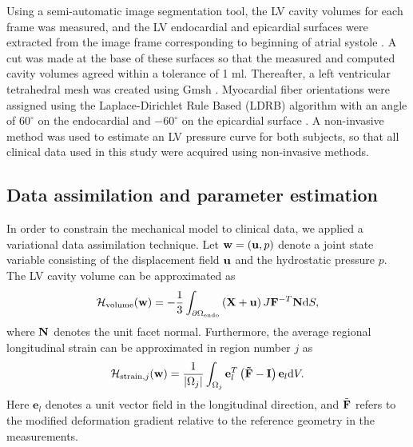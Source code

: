 Using a semi-automatic image segmentation tool, the LV cavity volumes for
each frame was measured, and the LV endocardial and epicardial
surfaces were extracted from the image frame corresponding to
beginning of atrial systole \cite{hansegaard2009semi}. A cut was made
at the base of these surfaces so that the measured and computed cavity
volumes agreed within a tolerance of 1 ml. Thereafter, a left
ventricular tetrahedral mesh was created using Gmsh
\cite{geuzaine2009gmsh}. Myocardial fiber orientations were assigned
using the Laplace-Dirichlet Rule Based  (LDRB) algorithm
\cite{bayer2012novel} with an angle of $60^{\circ}$ on the endocardial
and $-60^{\circ}$ on the epicardial surface
\cite{streeter1969fiber}. A non-invasive method
\cite{russell2012novel} was used to estimate an LV pressure curve for
both subjects, so that all clinical data used in this study were
acquired using non-invasive methods. 


\subsection{Data assimilation and parameter estimation}

In order to constrain the mechanical model to clinical data, we
applied a variational data assimilation technique. Let $\mathbf{w} =
(\mathbf{u},p)$ denote a joint state variable consisting of the
displacement field $\mathbf{u}$ and the hydrostatic pressure $p$. The LV
cavity volume can be approximated as  
\begin{align}
  \mathcal{H}_{\mathrm{volume}}(\mathbf{w})= -\frac{1}{3}\int_{\partial \Omega_{ \textnormal{\tiny \text{endo}}}}
  \left( \mathbf{X} + \mathbf{u} \right) J \mathbf{F}^{-T} \mathbf{N} \mathrm{d}S, 
  \label{paper4:eq:volume_operator}
\end{align}
where $\mathbf{N}$ denotes the unit facet normal. Furthermore, the average regional
longitudinal strain can be approximated in region number $j$ as
\begin{align}
  \mathcal{H}_{\mathrm{strain}, j}(\mathbf{w}) = \frac{1}{|\Omega_j|}\int_{\Omega_j}
  \mathbf{e}_l^T \left( \mathbf{\tilde{\mathbf{F}} - \mathbf{I}} \right)\mathbf{e}_l  \mathrm{d}V.
\end{align}
Here $\mathbf{e}_l$ denotes a unit vector field in
the longitudinal direction, and $\tilde{\mathbf{F}}$ refers to the modified deformation
gradient relative to the reference geometry in the measurements. 

